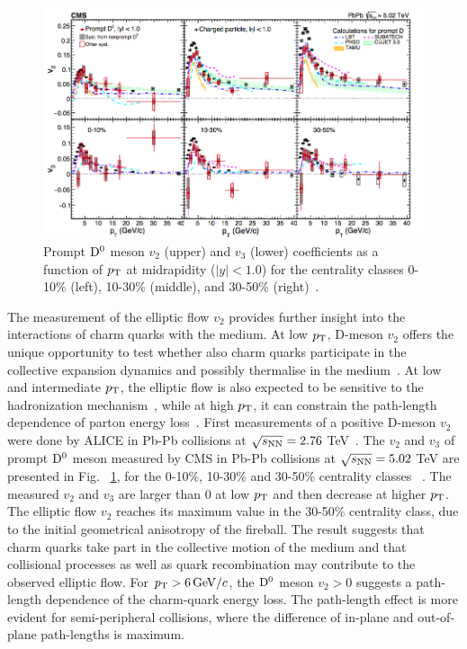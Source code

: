 \begin{figure}[!ht]
  \centering
        \includegraphics[width=14cm]{FigCap2/D0v2_CMS_5TeV.png}
  \caption{Prompt ${\rm D^0}$ meson $v_2$ (upper) and $v_3$ (lower) coefficients as a function of $p_{\rm T}$ at midrapidity ($|y| < 1.0$) for
the centrality classes 0-10\% (left), 10-30\% (middle), and 30-50\% (right)~\cite{Sirunyan:2017plt}.}
  \label{fig:D0v2CMS}
\end{figure}



The measurement of the elliptic flow $v_2$ provides further 
insight into the interactions of charm quarks with the medium. 
At low $p_{\rm T}$, D-meson $v_2$ offers the unique opportunity 
to test whether also charm quarks participate in the collective 
expansion dynamics and possibly thermalise in the medium~\cite{Greco:2003vf,Ollitrault:1992bk}. 
At low and intermediate $p_{\rm T}$, the elliptic flow is also expected to 
be sensitive to the hadronization mechanism~\cite{Greco:2003vf}, while at high $p_{\rm T}$, 
it can constrain the path-length dependence of parton energy loss~\cite{Gyulassy:2000gk}.
First measurements of a positive D-meson $v_2$ were done by ALICE
in Pb-Pb collisions at $\sqrt{s_{\rm NN}} = 2.76$ TeV~\cite{Abelev:2014ipa}.
The $v_2$ and $v_3$ of prompt ${\rm D^0}$ meson measured by CMS 
in Pb-Pb collisions at $\sqrt{s_{\rm NN}} = 5.02 $ TeV are presented in 
Fig.~	\ref{fig:D0v2CMS}, for the 0-10\%, 
10-30\% and 30-50\% centrality classes ~\cite{Sirunyan:2017plt}. 
The measured $v_2$ and $v_3$ are larger than 0 
at low $p_{\rm T}$ and then decrease at higher $p_{\rm T}$.
The elliptic flow $v_2$ reaches its maximum value in the 30-50\% centrality class,
due to the initial geometrical anisotropy of the fireball.
The result suggests that charm quarks take part in 
the collective motion of the medium and that collisional processes as well as quark 
recombination may contribute to the observed elliptic flow. 
For $p_{\rm T} > 6\, \mathrm{GeV}/c$, the ${\rm D^0}$ meson $v_2 >0$ suggests a 
path-length dependence of the charm-quark energy loss. 
The path-length effect is more evident for semi-peripheral collisions, where the difference of
in-plane and out-of-plane path-lengths is maximum.\\


